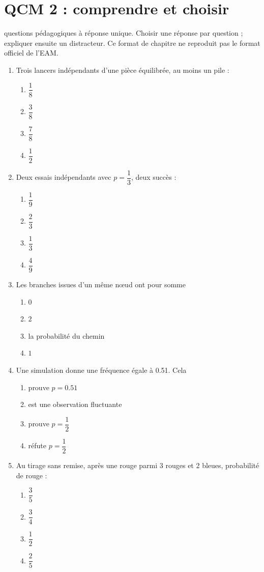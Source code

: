 \endgroup
\begingroup\small
{}\section*{QCM 2 : comprendre et choisir}\label{C05-Q2}
 questions pédagogiques à réponse unique. Choisir une réponse par question ; expliquer ensuite un distracteur. Ce format de chapitre ne reproduit pas le format officiel de l’EAM.
\begin{enumerate}
\item Trois lancers indépendants d’une pièce équilibrée, au moins un pile :
\begin{enumerate}[label=\Alph*.,itemsep=2pt]
\item $\dfrac{1}{8}$
\item $\dfrac{3}{8}$
\item $\dfrac{7}{8}$
\item $\dfrac{1}{2}$
\end{enumerate}
\item Deux essais indépendants avec $p=\dfrac{1}{3}$, deux succès :
\begin{enumerate}[label=\Alph*.,itemsep=2pt]
\item $\dfrac{1}{9}$
\item $\dfrac{2}{3}$
\item $\dfrac{1}{3}$
\item $\dfrac{4}{9}$
\end{enumerate}
\item Les branches issues d’un même nœud ont pour somme
\begin{enumerate}[label=\Alph*.,itemsep=2pt]
\item $0$
\item $2$
\item la probabilité du chemin
\item $1$
\end{enumerate}
\item Une simulation donne une fréquence égale à \num{0,51}. Cela
\begin{enumerate}[label=\Alph*.,itemsep=2pt]
\item prouve $p=\num{0,51}$
\item est une observation fluctuante
\item prouve $p=\dfrac{1}{2}$
\item réfute $p=\dfrac{1}{2}$
\end{enumerate}
\item Au tirage sans remise, après une rouge parmi 3 rouges et 2 bleues, probabilité de rouge :
\begin{enumerate}[label=\Alph*.,itemsep=2pt]
\item $\dfrac{3}{5}$
\item $\dfrac{3}{4}$
\item $\dfrac{1}{2}$
\item $\dfrac{2}{5}$
\end{enumerate}
\end{enumerate}
